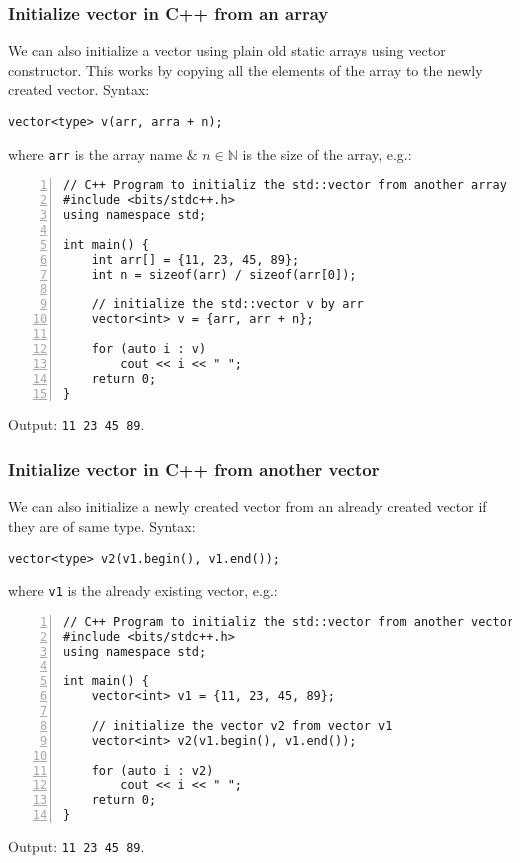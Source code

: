 \documentclass{article}
\begin{document}

\subsubsection{Initialize vector in C++ from an array}
We can also initialize a vector using plain old static arrays using vector constructor. This works by copying all the elements of the array to the newly created vector. Syntax:
\begin{verbatim}
vector<type> v(arr, arra + n);
\end{verbatim}
where {\tt arr} is the array name \& $n\in\mathbb{N}$ is the size of the array, e.g.:
\begin{Verbatim}[numbers=left,xleftmargin=5mm]
// C++ Program to initializ the std::vector from another array
#include <bits/stdc++.h>
using namespace std;

int main() {
    int arr[] = {11, 23, 45, 89};
    int n = sizeof(arr) / sizeof(arr[0]);
	
    // initialize the std::vector v by arr
    vector<int> v = {arr, arr + n};
	
    for (auto i : v)
        cout << i << " ";
    return 0;
}
\end{Verbatim}
Output: {\tt11 23 45 89}.


\subsubsection{Initialize vector in C++ from another vector}
We can also initialize a newly created vector from an already created vector if they are of same type. Syntax:
\begin{verbatim}
vector<type> v2(v1.begin(), v1.end());
\end{verbatim}
where {\tt v1} is the already existing vector, e.g.:
\begin{Verbatim}[numbers=left,xleftmargin=5mm]
// C++ Program to initializ the std::vector from another vector
#include <bits/stdc++.h>
using namespace std;

int main() {
    vector<int> v1 = {11, 23, 45, 89};
	
    // initialize the vector v2 from vector v1
    vector<int> v2(v1.begin(), v1.end());
	
    for (auto i : v2)
        cout << i << " ";
    return 0;
}
\end{Verbatim}
Output: {\tt11 23 45 89}.
\end{document}
